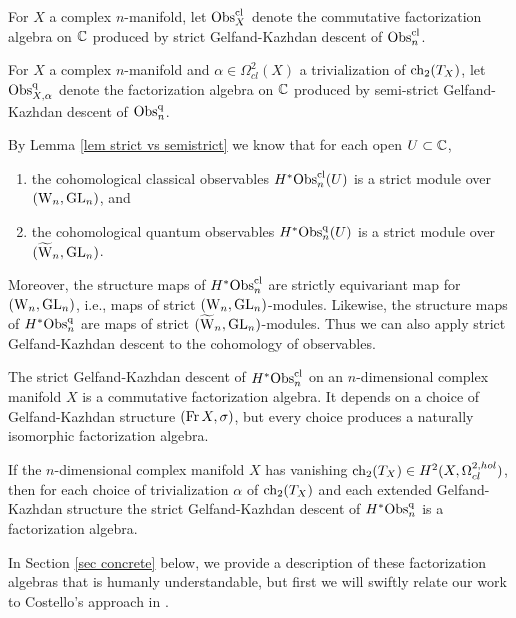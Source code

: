 \begin{dfn}
For $X$ a complex $n$-manifold, let ${\rm Obs}^{\rm cl}_X$ denote the commutative factorization algebra on $\mathbb C$ 
produced by strict Gelfand-Kazhdan descent of ${\rm Obs}^{\rm cl}_n$.

For $X$ a complex $n$-manifold and $\alpha \in \Omega^2_{cl}(X)$ a trivialization of ${\rm ch}_2(T_X)$,
let ${\rm Obs}^{\rm q}_{X,\alpha}$ denote the factorization algebra on $\mathbb C$
produced by semi-strict Gelfand-Kazhdan descent of ${\rm Obs}^{\rm q}_n$.
\end{dfn}

By Lemma \ref{lem strict vs semistrict} we know that for each open $U \subset \mathbb C$,
\begin{enumerate}
\item the cohomological classical observables $H^* {\rm Obs}^{\rm cl}_n(U)$ is a strict module over $({{\rm W}_n},{\rm GL}_n)$, and
\item the cohomological quantum observables $H^*{\rm Obs}^{\rm q}_n(U)$ is a strict module over $(\widetilde{{{\rm W}}}_n,{\rm GL}_n)$.
\end{enumerate}
Moreover, the structure maps of $H^*{\rm Obs}^{\rm cl}_n$ are strictly equivariant map for $({{\rm W}_n},{\rm GL}_n)$, 
i.e., maps of strict $({{\rm W}_n},{\rm GL}_n)$-modules.
Likewise, the structure maps of $H^*{\rm Obs}^{\rm q}_n$ are maps of strict $(\widetilde{{{\rm W}}}_n,{\rm GL}_n)$-modules.
Thus we can also apply strict Gelfand-Kazhdan descent to the cohomology of observables.

\begin{cor}
The strict Gelfand-Kazhdan descent of $H^*{\rm Obs}^{\rm cl}_n$ on an $n$-dimensional complex manifold $X$ 
is a commutative factorization algebra.
It depends on a choice of Gelfand-Kazhdan structure $({\rm Fr}\, X, \sigma)$,
but every choice produces a naturally isomorphic factorization algebra.

If the $n$-dimensional complex manifold $X$ has vanishing ${\rm ch}_2(T_X) \in H^2(X, \Omega^{2,hol}_{cl})$,
then for each choice of trivialization $\alpha$ of ${\rm ch}_2(T_X)$ and each extended Gelfand-Kazhdan structure
the strict Gelfand-Kazhdan descent of $H^*{\rm Obs}^{\rm q}_n$ is a factorization algebra.
\end{cor}

In Section \ref{sec concrete} below, we provide a description of these
factorization algebras that is humanly understandable,
but first we will swiftly relate our work to Costello's approach in \cite{WG2}.

